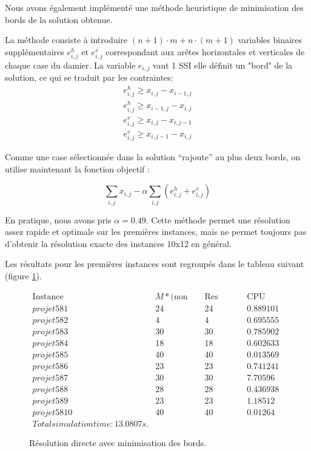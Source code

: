 \documentclass[12pt,a4paper]{article}
\begin{document}
Nous avons également implémenté une méthode heuristique de minimisation des bords de la solution obtenue.

La méthode consiste à introduire $(n+1) \cdot m + n\cdot (m+1) $ variables binaires supplémentaires $e^h_{i,j}$ et $e^v_{i,j}$ correspondant aux arêtes horizontales et verticales de chaque case du damier. La variable $e_{i,j}$ vaut 1 SSI elle définit un "bord" de la solution, ce qui se traduit par les contraintes: 
\begin{align}
e^h_{i,j}\geq x_{i,j} - x_{i-1,j} \\
e^h_{i,j}\geq x_{i-1,j} - x_{i,j} \\
e^v_{i,j}\geq x_{i,j} - x_{i,j-1} \\
e^v_{i,j}\geq x_{i,j-1} - x_{i,j}
\end{align}

Comme une case sélectionnée dans la solution ``rajoute'' au plus deux bords, on utilise maintenant la fonction objectif :

$$ \sum_{i,j} x_{i,j} - \alpha \sum_{i,j} \left( e^h_{i,j} + e^v_{i,j} \right)$$

En pratique, nous avons pris $\alpha= 0.49$.
Cette méthode permet une résolution assez rapide et optimale sur les premières instances, mais ne permet toujours pas d'obtenir la résolution exacte des instances 10x12 en général.

Les résultats pour les premières instances sont regroupés dans le tableau suivant (figure \ref{tabMinEdges}).


\begin{figure}[H]
\centering
\[
\begin{array}{c|c|c|c}
\text{Instance} & M* \text{(non conn.)} & \text{Res connexe }& \text{CPU time (s)} \\\hline
projet 5 8 1 &24 & 24 & 0.889101\\ \hline
projet 5 8 2 &4 & 4 & 0.695555\\ \hline
projet 5 8 3 &30 & 30 & 0.785902\\ \hline
projet 5 8 4 &18 & 18 & 0.602633\\ \hline
projet 5 8 5 &40 & 40 & 0.013569\\ \hline
projet 5 8 6 &23 & 23 & 0.741241\\ \hline
projet 5 8 7 &30 & 30 & 7.70596\\ \hline
projet 5 8 8 &28 & 28 & 0.436938\\ \hline
projet 5 8 9 &23 & 23 & 1.18512\\ \hline
projet 5 8 10 &40 & 40 & 0.01264\\ \hline
Total simulation time : 13.0807s.
\end{array}
\]
\label{tabMinEdges}
\caption{Résolution directe avec minimisation des bords.}
\end{figure}
\end{document}

